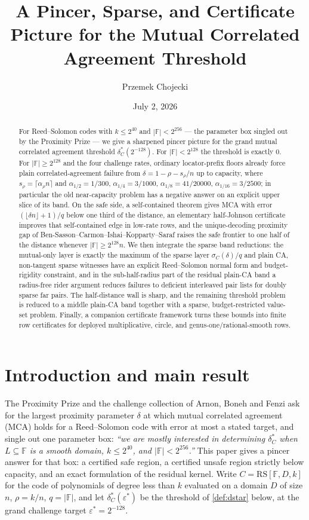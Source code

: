 \documentclass[11pt]{amsart}
\title[Pincer, Sparse, and Certificate Picture]{A Pincer, Sparse, and Certificate Picture for the Mutual Correlated Agreement Threshold}
\author{Przemek Chojecki}
\date{July 2, 2026}
\theoremstyle{definition}
\theoremstyle{remark}
\newcommand{\F}{\mathbb{F}}
\newcommand{\RS}{\mathrm{RS}}
\begin{document}
\begin{abstract}
For Reed--Solomon codes with $k\le2^{40}$ and $|\F|<2^{256}$ --- the parameter box singled out by the Proximity Prize --- we give a sharpened pincer picture for the grand mutual correlated agreement threshold $\delta^*_C(2^{-128})$. For $|\F|<2^{128}$ the threshold is exactly $0$. For $|\F|\ge2^{128}$ and the four challenge rates, ordinary locator-prefix floors already force plain correlated-agreement failure from $\delta=1-\rho-s_\rho/n$ up to capacity, where $s_\rho=\lceil\alpha_\rho n\rceil$ and $\alpha_{1/2}=1/300$, $\alpha_{1/4}=3/1000$, $\alpha_{1/8}=41/20000$, $\alpha_{1/16}=3/2500$; in particular the old near-capacity problem has a negative answer on an explicit upper slice of its band. On the safe side, a self-contained theorem gives MCA with error $(\lfloor\delta n\rfloor+1)/q$ below one third of the distance, an elementary half-Johnson certificate improves that self-contained edge in low-rate rows, and the unique-decoding proximity gap of Ben-Sasson--Carmon--Ishai--Kopparty--Saraf raises the safe frontier to one half of the distance whenever $|\F|\ge2^{128}n$. We then integrate the sparse band reductions: the mutual-only layer is exactly the maximum of the sparse layer $\sigma_C(\delta)/q$ and plain CA, non-tangent sparse witnesses have an explicit Reed--Solomon normal form and budget-rigidity constraint, and in the sub-half-radius part of the residual plain-CA band a radius-free rider argument reduces failures to deficient interleaved pair lists for doubly sparse far pairs. The half-distance wall is sharp, and the remaining threshold problem is reduced to a middle plain-CA band together with a sparse, budget-restricted value-set problem. Finally, a companion certificate framework turns these bounds into finite row certificates for deployed multiplicative, circle, and genus-one/rational-smooth rows.
\end{abstract}

\maketitle

\section{Introduction and main result}\label{sec:intro}

The Proximity Prize \cite{ProximityPrize} and the challenge collection of Arnon, Boneh and Fenzi \cite{ABF26} ask for the largest proximity parameter $\delta$ at which mutual correlated agreement (MCA) holds for a Reed--Solomon code with error at most a stated target, and single out one parameter box: \emph{``we are mostly interested in determining $\delta^*_C$ when $L\subseteq\F$ is a smooth domain, $k\le2^{40}$, and $|\F|<2^{256}$.''} This paper gives a pincer answer for that box: a certified safe region, a certified unsafe region strictly below capacity, and an exact formulation of the residual kernel. Write $C=\RS[\F,D,k]$ for the code of polynomials of degree less than $k$ evaluated on a domain $D$ of size $n$, $\rho=k/n$, $q=|\F|$, and let $\delta^*_C(\varepsilon^*)$ be the threshold of \cref{def:dstar} below, at the grand challenge target $\varepsilon^*=2^{-128}$.
\end{document}
